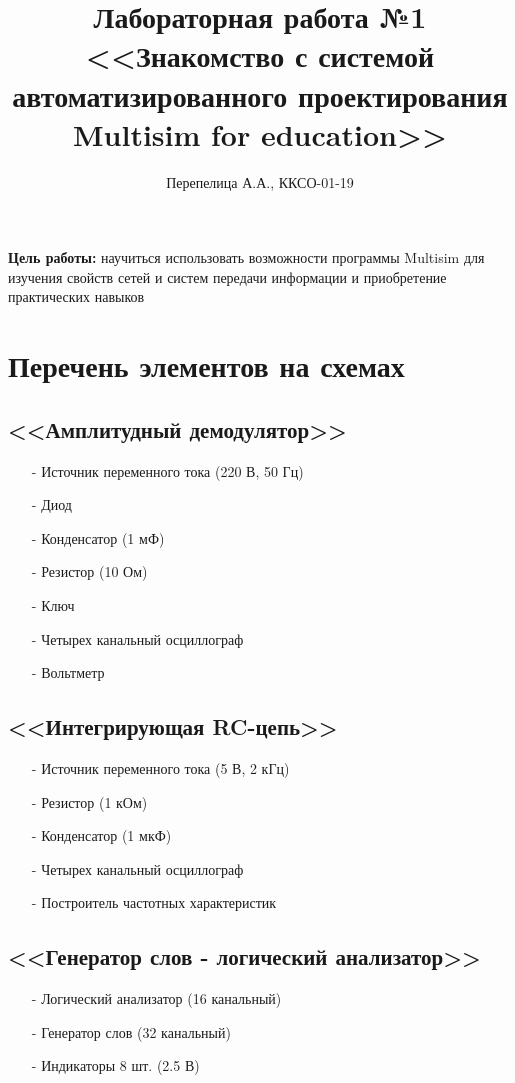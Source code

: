 \documentclass[11pt]{article}
\title{\textbf{Лабораторная работа №1\\<<Знакомство с системой автоматизированного проектирования Multisim for education>>}}
\author{Перепелица А.А., ККСО-01-19}
\date{}
\begin{document}
\maketitle
\thispagestyle{empty}
\textbf{Цель работы:} научиться использовать возможности программы Multisim для изучения свойств сетей и систем передачи информации и приобретение практических навыков
\section{Перечень элементов на схемах}
\subsection{<<Амплитудный демодулятор>>}
\begin{itemize}
    \item[-] Источник переменного тока (220 В, 50 Гц)
    \item[-] Диод
    \item[-] Конденсатор (1 мФ)
    \item[-] Резистор (10 Ом)
    \item[-] Ключ
    \item[-] Четырех канальный осциллограф
    \item[-] Вольтметр
\end{itemize}
\subsection{<<Интегрирующая RC-цепь>>}
\begin{itemize}
    \item[-] Источник переменного тока (5 В, 2 кГц)
    \item[-] Резистор (1 кОм)
    \item[-] Конденсатор (1 мкФ)
    \item[-] Четырех канальный осциллограф
    \item[-] Построитель частотных характеристик
\end{itemize}
\subsection{<<Генератор слов - логический анализатор>>}
\begin{itemize}
    \item[-] Логический анализатор (16 канальный)
    \item[-] Генератор слов (32 канальный)
    \item[-] Индикаторы 8 шт. (2.5 В)
\end{itemize}
\end{document}
